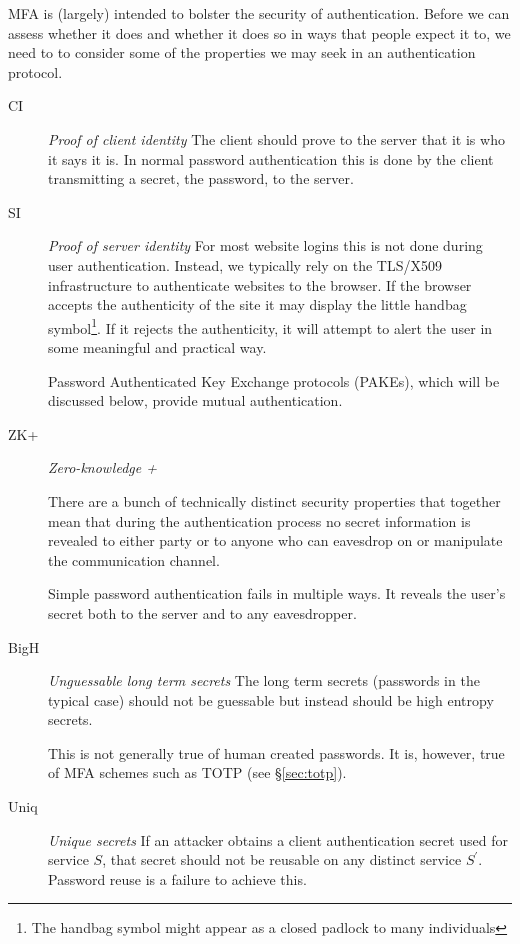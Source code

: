 \documentclass{soups}
\newcommand{\propdescription}[1]{\textit{#1}\newline}
\begin{document}
MFA is (largely) intended to bolster the security of authentication.
Before we can assess whether it does and whether it does so in ways that people expect it to, we need to to consider some of the properties we may seek in an authentication protocol.

\begin{description}
  \item[CI] \propdescription{Proof of client identity}
    The client should prove to the server that it is who it says it is.
    In normal password authentication this is done by the client transmitting a secret, the password, to the server.

  \item[SI] \propdescription{Proof of server identity}
    For most website logins this is not done during user authentication.
    Instead, we typically rely on the TLS/X509 infrastructure to authenticate websites to the browser. If the browser accepts the authenticity of the site it may display the little handbag symbol\footnote{The handbag symbol might appear as a closed padlock to many individuals}. If it rejects the authenticity, it will attempt to alert the user in some meaningful and practical way.
	 
    Password Authenticated Key Exchange protocols (PAKEs), which will be discussed below, provide mutual authentication.

  \item[ZK+] \propdescription{Zero-knowledge +}
  
  There are a bunch of technically distinct security properties that together mean that during the authentication process no secret information is revealed to either party or to anyone who can eavesdrop on or manipulate the communication channel.
  
  Simple password authentication fails in multiple ways. It reveals the user's secret both to the server and to any eavesdropper.
   
  
  \item[BigH] \propdescription{Unguessable long term secrets}
    The long term secrets (passwords in the typical case) should not be guessable
    but instead should be high entropy secrets.
	
	This is not generally true of human created passwords.
    It is, however, true of MFA schemes such as TOTP (see \S\ref{sec:totp}).

  \item[Uniq] \propdescription{Unique secrets}
    If an attacker obtains a client authentication secret used for service $S$, 
    that secret should not be reusable on any distinct service $S^\prime$.
    Password reuse is a failure to achieve this. 


\end{description}
\end{document}
